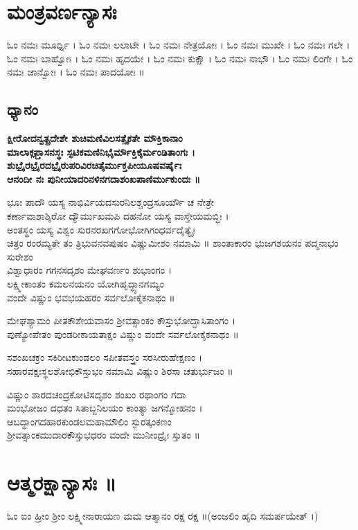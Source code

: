   \section{ಮಂತ್ರವರ್ಣನ್ಯಾಸಃ}
ಓಂ  ನಮಃ ಮೂರ್ಧ್ನಿ । ಓಂ  ನಮಃ ಲಲಾಟೇ । ಓಂ  ನಮಃ ನೇತ್ರಯೋಃ । ಓಂ  ನಮಃ ಮುಖೇ । ಓಂ  ನಮಃ ಗಲೇ । ಓಂ  ನಮಃ ಬಾಹ್ವೋಃ । ಓಂ  ನಮಃ ಹೃದಯೇ । ಓಂ  ನಮಃ ಕುಕ್ಷೌ । ಓಂ  ನಮಃ ನಾಭೌ । ಓಂ  ನಮಃ ಲಿಂಗೇ । ಓಂ  ನಮಃ ಜಾನ್ವೋಃ । ಓಂ  ನಮಃ ಪಾದಯೋಃ ॥
\begin{center}\section{ಧ್ಯಾನಂ}
{\bfseries ಕ್ಷೀರೋದನ್ವತ್ಪ್ರದೇಶೇ ಶುಚಿಮಣಿವಿಲಸತ್ಸೈಕತೇ ಮೌಕ್ತಿಕಾನಾಂ\\
ಮಾಲಾಕೢಪ್ತಾಸನಸ್ಥಃ ಸ್ಫಟಿಕಮಣಿನಿಭೈರ್ಮೌಕ್ತಿಕೈರ್ಮಂಡಿತಾಂಗಃ ।\\
ಶುಭ್ರೈರಭ್ರೈರದಭ್ರೈರುಪರಿವಿರಚಿತೈರ್ಮುಕ್ತಪೀಯೂಷವರ್ಷೈಃ\\
ಆನಂದೀ ನಃ ಪುನೀಯಾದರಿನಳಿನಗದಾಶಂಖಪಾಣಿರ್ಮುಕುಂದಃ ॥

ಭೂಃ ಪಾದೌ ಯಸ್ಯ ನಾಭಿರ್ವಿಯದಸುರನಿಲಶ್ಚಂದ್ರಸೂರ್ಯೌ ಚ ನೇತ್ರೇ\\
ಕರ್ಣಾವಾಶಾಶ್ಶಿರೋ ದ್ಯೌರ್ಮುಖಮಪಿ ದಹನೋ ಯಸ್ಯ ವಾಸ್ತೇಯಮಬ್ಧಿಃ ।\\
ಅಂತಸ್ಥಂ ಯಸ್ಯ ವಿಶ್ವಂ ಸುರನರಖಗಗೋಭೋಗಿಗಂಧರ್ವದೈತ್ಯೈಃ\\
ಚಿತ್ರಂ ರಂರಮ್ಯತೇ ತಂ ತ್ರಿಭುವನವಪುಷಂ ವಿಷ್ಣುಮೀಶಂ ನಮಾಮಿ ॥
\newpage
ಶಾಂತಾಕಾರಂ ಭುಜಗಶಯನಂ ಪದ್ಮನಾಭಂ ಸುರೇಶಂ\\
ವಿಶ್ವಾಧಾರಂ ಗಗನಸದೃಶಂ ಮೇಘವರ್ಣಂ ಶುಭಾಂಗಂ ।\\
ಲಕ್ಷ್ಮೀಕಾಂತಂ ಕಮಲನಯನಂ ಯೋಗಿಹೃದ್ಧ್ಯಾನಗಮ್ಯಂ\\
ವಂದೇ ವಿಷ್ಣುಂ ಭವಭಯಹರಂ ಸರ್ವಲೋಕೈಕನಾಥಂ ॥

ಮೇಘಶ್ಯಾಮಂ ಪೀತಕೌಶೇಯವಾಸಂ ಶ್ರೀವತ್ಸಾಂಕಂ ಕೌಸ್ತುಭೋದ್ಭಾಸಿತಾಂಗಂ ।\\
ಪುಣ್ಯೋಪೇತಂ ಪುಂಡರೀಕಾಯತಾಕ್ಷಂ ವಿಷ್ಣುಂ ವಂದೇ ಸರ್ವಲೋಕೈಕನಾಥಂ ॥

ಸಶಂಖಚಕ್ರಂ ಸಕಿರೀಟಕುಂಡಲಂ ಸಪೀತವಸ್ತ್ರಂ ಸರಸೀರುಹೇಕ್ಷಣಂ ।\\
ಸಹಾರವಕ್ಷಃಸ್ಥಲಶೋಭಿಕೌಸ್ತುಭಂ ನಮಾಮಿ ವಿಷ್ಣುಂ ಶಿರಸಾ ಚತುರ್ಭುಜಂ ॥

ವಿಷ್ಣುಂ ಶಾರದಚಂದ್ರಕೋಟಿಸದೃಶಂ ಶಂಖಂ ರಥಾಂಗಂ ಗದಾ\\
ಮಂಭೋಜಂ ದಧತಂ ಸಿತಾಬ್ಜನಿಲಯಂ ಕಾಂತ್ಯಾ ಜಗನ್ಮೋಹನಂ ।\\
ಆಬದ್ಧಾಂಗದಹಾರಕುಂಡಲಮಹಾಮೌಲಿಂ ಸ್ಫುರತ್ಕಂಕಣಂ\\
ಶ್ರೀವತ್ಸಾಂಕಮುದಾರಕೌಸ್ತುಭಧರಂ ವಂದೇ ಮುನೀಂದ್ರೈಃ ಸ್ತುತಂ ॥}\end{center}
\newpage
 \section{ಆತ್ಮರಕ್ಷಾನ್ಯಾಸಃ ॥}
ಓಂ ಐಂ ಹ್ರೀಂ ಶ್ರೀಂ ಲಕ್ಷ್ಮೀನಾರಾಯಣ ಮಮ ಆತ್ಮಾನಂ ರಕ್ಷ ರಕ್ಷ ॥(ಅಂಜಲಿಂ ಹೃದಿ ಸಮರ್ಪಯೇತ್ ।)
